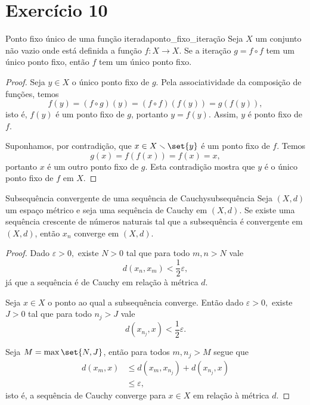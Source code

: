 \section*{Exercício 10}
\begin{lemma}{Ponto fixo único de uma função iterada}{ponto_fixo_iteração}
    Seja \(X\) um conjunto não vazio onde está definida a função \(f : X \to X\). Se a iteração \(g = f\circ f\) tem um único ponto fixo, então \(f\) tem um único ponto fixo.
\end{lemma}
\begin{proof}
    Seja \(y \in X\) o único ponto fixo de \(g\). Pela associatividade da composição de funções, temos
    \begin{equation*}
        f(y) = (f\circ g)(y) = (f\circ f)(f(y)) = g(f(y)),
    \end{equation*}
    isto é, \(f(y)\) é um ponto fixo de \(g\), portanto \(y = f(y)\). Assim, \(y\) é ponto fixo de \(f\).

    Suponhamos, por contradição, que \(x \in X\smallsetminus \set{y}\) é um ponto fixo de \(f\). Temos
    \begin{equation*}
        g(x) = f(f(x)) = f(x) = x,
    \end{equation*}
    portanto \(x\) é um outro ponto fixo de \(g\). Esta contradição mostra que \(y\) é o único ponto fixo de \(f\) em \(X\).
\end{proof}

\begin{lemma}{Subsequência convergente de uma sequência de Cauchy}{subsequência}
    Seja \((X,d)\) um espaço métrico e seja  uma sequência de Cauchy em \((X,d)\). Se existe uma sequência crescente  de números naturais tal que a subsequência  é convergente em \((X,d)\), então \(x_n\) converge em \((X,d)\).
\end{lemma}
\begin{proof}
    Dado \(\varepsilon > 0,\) existe \(N > 0\) tal que para todo \(m,n > N\) vale
    \begin{equation*}
        d(x_n, x_m) < \frac12 \varepsilon,
    \end{equation*}
    já que a sequência é de Cauchy em relação à métrica \(d\).

    Seja \(x \in X\) o ponto ao qual a subsequência converge. Então dado \(\varepsilon > 0,\) existe \(J > 0\) tal que para todo \(n_j > J\) vale
    \begin{equation*}
        d(x_{n_j}, x) < \frac12 \varepsilon.
    \end{equation*}

    Seja \(M = \max\set{N,J}\), então para todos \(m, n_j > M\) segue que
    \begin{align*}
        d(x_m, x) &\leq d(x_m, x_{n_j}) + d(x_{n_j}, x)\\
                  &\leq \varepsilon,
    \end{align*}
    isto é, a sequência de Cauchy converge para \(x \in X\) em relação à métrica \(d\).
\end{proof}

